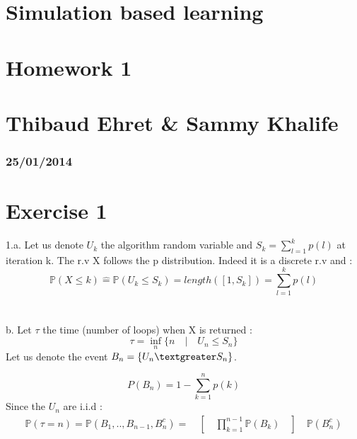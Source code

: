 


\geometry{hmargin=2.5cm,vmargin=2cm}   


\section*{Simulation based learning}
\section*{Homework 1}
\section*{Thibaud Ehret \& Sammy Khalife}
\subsubsection*{25/01/2014}

\section*{Exercise 1}
1.a. Let us denote $U_{k}$ the algorithm random variable and $S_{k}=\sum_{l=1}^{k}p(l)$ at iteration k. The r.v X follows the p distribution. Indeed it is a discrete r.v and : 
$$\mathbb{P}(X \leq k)\hat{=}\mathbb{P}(U_{k} \leq S_{k})=length([1,S_{k}])=\sum_{l=1}^{k}p(l)$$~\\
~\\
b. Let $\tau$ the time (number of loops) when X is returned :
$$\tau=\inf_{n}\{n \quad | \quad U_{n} \leq S_{n}\}$$
Let us denote the event $B_{n}=\{U_{n} \textgreater S_{n}\}$.

$$P(B_{n})=1-\sum_{k=1}^{n}p(k)$$
Since the $U_{n}$ are i.i.d :
\begin{eqnarray*}
\mathbb{P}(\tau=n)=\mathbb{P}(B_{1},.., B_{n-1}, B_{n}^{c})=\quad [\quad \prod_{k=1}^{n-1}\mathbb{P}(B_k) \quad ]\quad \mathbb{P}(B_n^{c})
\end{eqnarray*}

